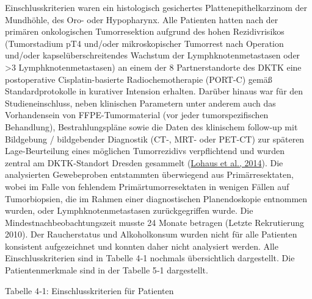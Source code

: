 Einschlusskriterien waren ein histologisch gesichertes Plattenepithelkarzinom der Mundhöhle, des Oro- oder Hypopharynx. Alle Patienten hatten nach der primären onkologischen Tumorresektion aufgrund des hohen Rezidivrisikos (Tumorstadium pT4 und/oder mikroskopischer Tumorrest nach Operation und/oder kapselüberschreitendes Wachstum der Lymphknotenmetastasen oder \textgreater3 Lymphknotenmetastasen) an einem der 8 Partnerstandorte des DKTK eine postoperative Cisplatin-basierte Radiochemotherapie (PORT-C) gemäß Standardprotokolle in kurativer Intension erhalten. Darüber hinaus war für den Studieneinschluss, neben klinischen Parametern unter anderem auch das Vorhandensein von FFPE-Tumormaterial (vor jeder tumorspezifischen Behandlung), Bestrahlungspläne sowie die Daten des klinischem follow-up mit Bildgebung / bildgebender Diagnostik (CT-, MRT- oder PET-CT) zur späteren Lage-Beurteilung eines möglichen Tumorrezidivs verpflichtend und wurden zentral am DKTK-Standort Dresden gesammelt (\href{about:blank\#_ENREF_52}{Lohaus et al., 2014}). Die analysierten Gewebeproben entstammten überwiegend aus Primärresektaten, wobei im Falle von fehlendem Primärtumorresektaten in wenigen Fällen auf Tumorbiopsien, die im Rahmen einer diagnostischen Planendoskopie entnommen wurden, oder Lymphknotenmetastasen zurückgegriffen wurde. Die Mindestnachbeobachtungszeit musste 24 Monate betragen (Letzte Rekrutierung 2010). Der Raucherstatus und Alkoholkonsum wurden nicht für alle Patienten konsistent aufgezeichnet und konnten daher nicht analysiert werden. Alle Einschlusskriterien sind in Tabelle 4‑1 nochmals übersichtlich dargestellt. Die Patientenmerkmale sind in der Tabelle 5‑1 dargestellt.

Tabelle 4‑1: Einschlusskriterien für Patienten

